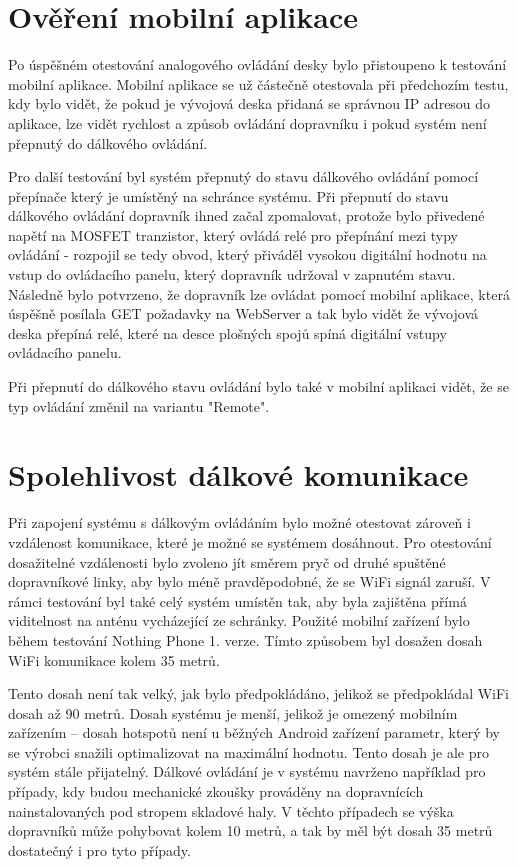 \section{Ověření mobilní aplikace}

Po úspěšném otestování analogového ovládání desky bylo přistoupeno k testování mobilní aplikace. Mobilní aplikace se už částečně otestovala při předchozím testu, kdy bylo vidět, že pokud je vývojová deska přidaná se správnou IP adresou do aplikace, lze vidět rychlost a způsob ovládání dopravníku i pokud systém není přepnutý do dálkového ovládání.

Pro další testování byl systém přepnutý do stavu dálkového ovládání pomocí přepínače který je umístěný na schránce systému. Při přepnutí do stavu dálkového ovládání dopravník ihned začal zpomalovat, protože bylo přivedené napětí na MOSFET tranzistor, který ovládá relé pro přepínání mezi typy ovládání - rozpojil se tedy obvod, který přiváděl vysokou digitální hodnotu na vstup do ovládacího panelu, který dopravník udržoval v zapnutém stavu. Následně bylo potvrzeno, že dopravník lze ovládat pomocí mobilní aplikace, která úspěšně posílala GET požadavky na WebServer a tak bylo vidět že vývojová deska přepíná relé, které na desce plošných spojů spíná digitální vstupy ovládacího panelu.

Při přepnutí do dálkového stavu ovládání bylo také v mobilní aplikaci vidět, že se typ ovládání změnil na variantu "Remote".

\section{Spolehlivost dálkové komunikace}

Při zapojení systému s dálkovým ovládáním bylo možné otestovat zároveň i vzdálenost komunikace, které je možné se systémem dosáhnout. Pro otestování dosažitelné vzdálenosti bylo zvoleno jít směrem pryč od druhé spuštěné dopravníkové linky, aby bylo méně pravděpodobné, že se WiFi signál zaruší. V rámci testování byl také celý systém umístěn tak, aby byla zajištěna přímá viditelnost na anténu vycházející ze schránky. Použité mobilní zařízení bylo během testování Nothing Phone 1. verze. Tímto způsobem byl dosažen dosah WiFi komunikace kolem 35 metrů.

Tento dosah není tak velký, jak bylo předpokládáno, jelikož se předpokládal WiFi dosah až 90 metrů. Dosah systému je menší, jelikož je omezený mobilním zařízením – dosah hotspotů není u běžných Android zařízení parametr, který by se výrobci snažili optimalizovat na maximální hodnotu. Tento dosah je ale pro systém stále přijatelný. Dálkové ovládání je v systému navrženo například pro případy, kdy budou mechanické zkoušky prováděny na dopravnících nainstalovaných pod stropem skladové haly. V těchto případech se výška dopravníků může pohybovat kolem 10 metrů, a tak by měl být dosah 35 metrů dostatečný i pro tyto případy.

